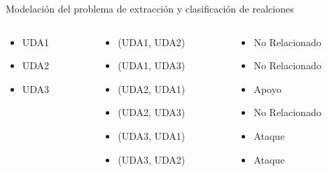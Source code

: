 \documentclass{beamer}
\begin{document}
\begin{frame}{Modelación del problema de extracción y clasificación de realciones}

    \begin{columns}
        \pause
        \begin{column}{0.3\textwidth}
            \begin{itemize}
                \item UDA1 
                \item UDA2 
                \item UDA3
            \end{itemize}
        \end{column}
        \pause
        \begin{column}{0.4\textwidth}
            \begin{itemize}
                \item (UDA1, UDA2)
                \item (UDA1, UDA3)
                \item (UDA2, UDA1)
                \item (UDA2, UDA3)
                \item (UDA3, UDA1)
                \item (UDA3, UDA2)
            \end{itemize}
        \end{column}
        \pause
        \begin{column}{0.4\textwidth}
            \begin{itemize}
                \item No Relacionado
                \item No Relacionado
                \item Apoyo 
                \item No Relacionado
                \item Ataque
                \item Ataque
            \end{itemize}
        \end{column}
    \end{columns}

\end{frame}
\end{document}
